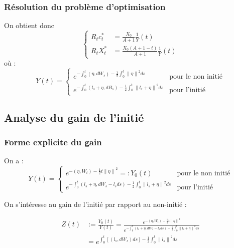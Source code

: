 \documentclass{beamer}
\begin{document}
\begin{frame}
\frametitle{Résolution du problème d'optimisation}
On obtient donc
\begin{equation*}
\begin{cases}
R_t c_t^* &= \frac{X_0}{A + 1} \frac{1}{Y} \left( t \right) \\
R_t X_t^* &= \frac{X_0 \left( A + 1 - t \right)}{A + 1} \frac{1}{Y} \left( t \right)
\end{cases}
\end{equation*}
où : 
\begin{displaymath}
Y \left( t \right) = 
\begin{cases}
e^{- \int_{0}^{t} \left( \eta, dW_{s} \right)-\frac{1}{2} \int_{0}^{t} {\| \eta \|}^{2} ds} & \text{pour le non initié} \\
e^{- \int_{0}^{t} \left( l_{s} + \eta, dB_{s} \right) - \frac{1}{2} \int_{0}^{t} {\| l_{s} + \eta \|}^{2} ds} & \text{pour l'initié}
\end{cases}
\end{displaymath}
\end{frame}
\subsection{Analyse du gain de l'initié}

\begin{frame}
\frametitle{Forme explicite du gain}
\par On a :
\begin{displaymath}
Y \left( t \right) = 
\begin{cases}
e^{- \left( \eta, W_{t} \right)-\frac{1}{2} t {\| \eta \|}^{2}} =: Y_0 \left( t \right) & \text{pour le non initié} \\
e^{- \int_{0}^{t} \left( l_{s} + \eta, dW_{s} - l_s ds \right) - \frac{1}{2} \int_{0}^{t} {\| l_{s} + \eta \|}^{2} ds} & \text{pour l'initié}
\end{cases}
\end{displaymath}

\par On s'intéresse au gain de l'initié par rapport au non-initié : 

\begin{displaymath}
	\begin{split}
	Z \left( t \right) &:= \frac{Y_0 \left( t \right)}{Y \left( t \right)} = \frac{ e^{- \left( \eta, W_{t} \right)-\frac{1}{2} t {\| \eta \|}^{2}}}{e^{- \int_{0}^{t} \left( l_{s} + \eta, dW_{s} - l_s ds \right) - \frac{1}{2} \int_{0}^{t} {\| l_{s} + \eta \|}^{2} ds}} \\
	&= e^{ \int_{0}^{t} \left[ \left( l_s, dW_{s} \right) ds \right] - \frac{1}{2} \int_{0}^{t} {\| l_{s} \|}^{2} ds}
	\end{split}
\end{displaymath}
\end{frame}
 
\end{document}
